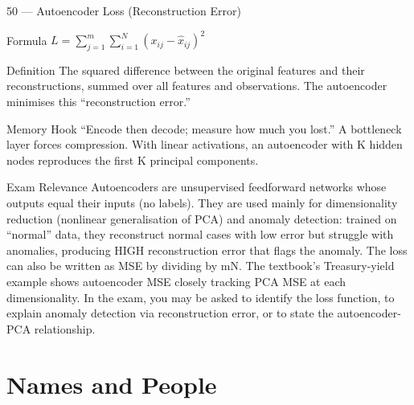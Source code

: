 \documentclass[aspectratio=169,8pt]{beamer}
\begin{document}
	\begin{frame}{50 --- Autoencoder Loss (Reconstruction Error)}
		\begin{block}{Formula}
			$L = \sum_{j=1}^{m}\sum_{i=1}^{N}(x_{ij} - \hat{x}_{ij})^2$
		\end{block}
		\begin{block}{Definition}
			The squared difference between the original features and their reconstructions, summed over all features and observations. The autoencoder minimises this ``reconstruction error.''
		\end{block}
		\begin{block}{Memory Hook}
			``Encode then decode; measure how much you lost.'' A bottleneck layer forces compression. With linear activations, an autoencoder with K hidden nodes reproduces the first K principal components.
		\end{block}
		\begin{block}{Exam Relevance}
			Autoencoders are unsupervised feedforward networks whose outputs equal their inputs (no labels). They are used mainly for dimensionality reduction (nonlinear generalisation of PCA) and anomaly detection: trained on ``normal'' data, they reconstruct normal cases with low error but struggle with anomalies, producing HIGH reconstruction error that flags the anomaly. The loss can also be written as MSE by dividing by mN. The textbook's Treasury-yield example shows autoencoder MSE closely tracking PCA MSE at each dimensionality. In the exam, you may be asked to identify the loss function, to explain anomaly detection via reconstruction error, or to state the autoencoder-PCA relationship.
		\end{block}
	\end{frame}
	
	\section{Names and People}
	
\end{document}
